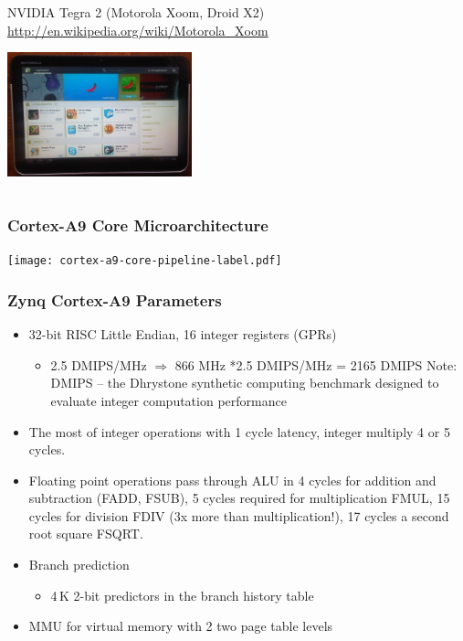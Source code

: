 \documentclass{beamer}
\begin{document}
\begin{frame}
\begin{columns}
\begin{column}{0.5\textwidth}
\begin{center}
  \end{center}
  {\scriptsize
  NVIDIA Tegra 2 (Motorola Xoom, Droid X2) \tiny \linebreak
  \url{http://en.wikipedia.org/wiki/Motorola_Xoom}
  }
  \begin{center}
    \includegraphics[width=0.4\textwidth]{fig/motorola-xoom.jpg}
  \end{center}
\end{column}
\end{columns}
\end{frame}

\begin{frame}
\frametitle{Cortex-A9 Core Microarchitecture}

\texttt{[image: cortex-a9-core-pipeline-label.pdf]}

\end{frame}

\begin{frame}
\frametitle{Zynq Cortex-A9 Parameters}

\begin{itemize}
 \item 32-bit RISC Little Endian, 16 integer registers (GPRs)
 \begin{itemize}
  \item 2.5 DMIPS/MHz $\Rightarrow$ 866 MHz *2.5 DMIPS/MHz = 2165 DMIPS
  {\newline Note: DMIPS -- the Dhrystone synthetic computing benchmark designed to evaluate integer computation performance}
 \end{itemize}
 \item The most of integer operations with 1 cycle latency, integer multiply 4 or 5 cycles.
 \item Floating point operations pass through ALU in 4 cycles for addition and subtraction (FADD, FSUB), 5 cycles required for multiplication FMUL, 15 cycles for division FDIV (3x more than multiplication!), 17 cycles a second root square FSQRT.
 \item Branch prediction
 \begin{itemize}
  \item 4\,K 2-bit predictors in the branch history table
 \end{itemize}
 \item MMU for virtual memory with 2 two page table levels
\end{itemize}

\end{frame}
\end{document}
